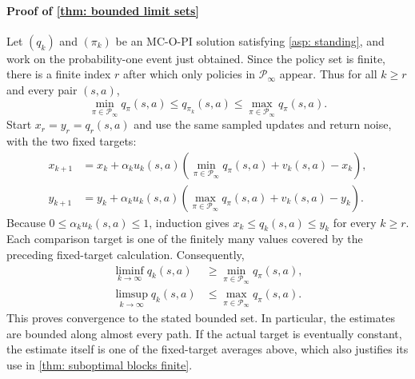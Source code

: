 \documentclass[twoside,11pt]{article}
\newcommand{\polset}{\mathcal{P}}
\DeclareRobustCommand{\reviewbarstart}{%
  \ifhmode %
    \vadjust{\vbox to 0pt{%
      \vskip-\ht\strutbox %
      \vskip-\dp\strutbox %
      \cbstart[\changebarwidth] %
      \vss %
    }}%
  \else %
    \cbstart[\changebarwidth]%
  \fi %
} %
\providecommand{\DIFadd}[1]{#1} %
\providecommand{\DIFaddbegin}{\reviewbarstart} %
\providecommand{\DIFaddend}{\protect\cbend} %
\def\DIFadd#1{#1}%
\def\DIFaddbegin{}%
\def\DIFaddend{}%
\begin{document}
 \DIFaddbegin \paragraph{\DIFadd{Proof of \autoref{thm: bounded limit sets}}}
\DIFadd{Let $(q_k)$ and $(\pi_k)$ be an MC-O-PI solution satisfying \autoref{asp: standing}, and work on the probability-one event just obtained. Since the policy set is finite, there is a finite index $r$ after which only }\DIFaddend policies in $\polset_\infty$  \DIFaddbegin \DIFadd{appear.
}\DIFaddend Thus for all  \DIFaddbegin \DIFadd{$k\ge r$ and every pair $(s,a)$,
}\[
\DIFadd{\min_{\pi\in\polset_\infty}q_\pi(s,a)
\le q_{\pi_k}(s,a)
\le\max_{\pi\in\polset_\infty}q_\pi(s,a).
}\]\DIFaddend 
 \DIFaddbegin \DIFadd{Start $x_r=y_r=q_r(s,a)$ and use the same sampled updates and return noise, with the two fixed targets:
}\begin{align*}
\DIFadd{x_{k+1}}&\DIFadd{=x_k+\alpha_k u_k(s,a)
\left(\min_{\pi\in\polset_\infty}q_\pi(s,a)+v_k(s,a)-x_k\right),}\\
\DIFadd{y_{k+1}}&\DIFadd{=y_k+\alpha_k u_k(s,a)
\left(\max_{\pi\in\polset_\infty}q_\pi(s,a)+v_k(s,a)-y_k\right).
}\end{align*}\DIFaddend 
 \DIFaddbegin \DIFadd{Because $0\le\alpha_k u_k(s,a)\le1$, induction gives $x_k\le q_k(s,a)\le y_k$ for every $k\ge r$.
Each comparison target is one of the finitely many values covered by the preceding fixed-target calculation. Consequently,
}\begin{align*}
\DIFadd{\liminf_{k\to\infty}q_k(s,a)}&\DIFadd{\ge\min_{\pi\in\polset_\infty}q_\pi(s,a),}\\
\DIFadd{\limsup_{k\to\infty}q_k(s,a)}&\DIFadd{\le\max_{\pi\in\polset_\infty}q_\pi(s,a).
}\end{align*}
\DIFadd{This proves convergence to the stated bounded set. In particular, the estimates are bounded along almost every path. If the actual target is eventually constant, the estimate itself is one of the fixed-target averages above, which also justifies its use in \autoref{thm: suboptimal blocks finite}.
}\hfill\BlackBox
\DIFaddend 
\end{document}
